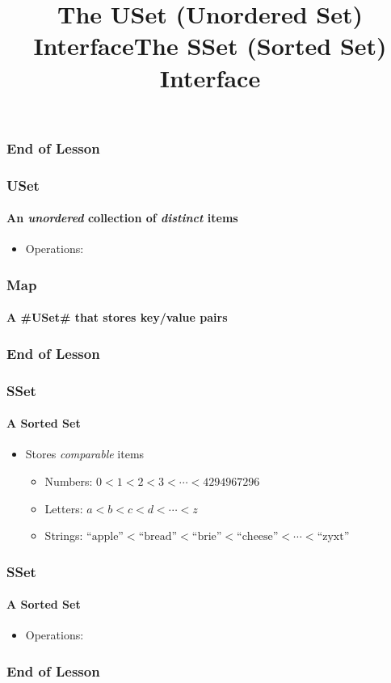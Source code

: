 \documentclass[aspectratio=169,xcolor=dvipsnames]{beamer}
\renewcommand{\emph}[1]{{\itshape\color{blue}#1}}
\newcommand{\emphen}[1]{{\itshape #1}}
\newcommand{\blank}{\begin{frame}\frametitle{End of Lesson}\end{frame}}
\newcommand{\titler}[1]{\blank\title{#1}\begin{frame}\titlepage\end{frame}}
\begin{document}
\titler{The USet (Unordered Set) Interface}


\begin{frame}
  \frametitle{USet}
  \framesubtitle{An \emphen{unordered} collection of \emphen{distinct} items}
  \begin{itemize}
    \item<+-> Operations: %
  \end{itemize}
     \begin{center}
     \end{center}

\end{frame}

\begin{frame}
  \frametitle{Map}
  \framesubtitle{A #USet# that stores key/value pairs}
 
     \begin{center}
     \end{center}
\end{frame}

\titler{The SSet (Sorted Set) Interface}

\begin{frame}
  \frametitle{SSet}
  \framesubtitle{A Sorted Set}
 
  \begin{itemize}
    \item<+->Stores \emph{comparable} items
    \begin{itemize}
       \item<+-> Numbers: $0 < 1 < 2 < 3 < \cdots < 4294967296$
       \item<+-> Letters: $a < b < c < d < \cdots < z$
       \item<+-> Strings: $\text{``apple''} < \text{``bread''} < \text{``brie''} 
                           < \text{``cheese''} < \cdots < \text{``zyxt''}$
    \end{itemize}
  \end{itemize}
\end{frame}

\begin{frame}
  \frametitle{SSet}
  \framesubtitle{A Sorted Set}

  \begin{itemize}
    \item<+-> Operations: %
  \end{itemize}
  \begin{center}
  \end{center}
\end{frame}

\titler{}
\end{document}

